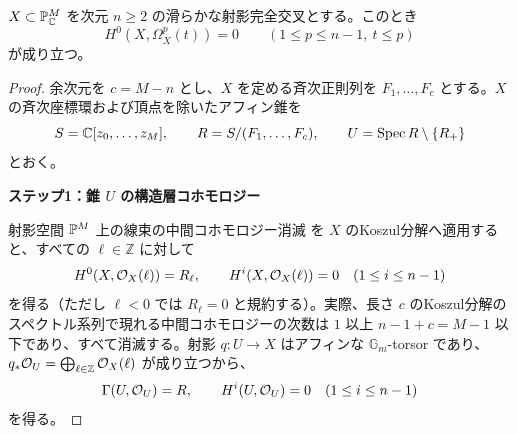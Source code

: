 \begin{lemma}[微分形式の低次数消滅]\label{lem:ci-low-twist-vanishing}
$X\subset\mathbb P^M_{\mathbb C}$ を次元 $n\ge2$ の滑らかな射影完全交叉とする。このとき
\begin{equation}
H^0(X,\Omega_X^p(t))=0
\qquad(1\le p\le n-1,\ t\le p)
\label{eq:ci-vanishing}
\end{equation}
が成り立つ。
\end{lemma}
\begin{proof}
余次元を $c=M-n$ とし、$X$ を定める斉次正則列を $F_1,\ldots,F_c$ とする。$X$ の斉次座標環および頂点を除いたアフィン錐を
\begin{equation}
S=\mathbb C[z_0,\ldots,z_M],\qquad
R=S/(F_1,\ldots,F_c),\qquad
U=\operatorname{Spec} R\setminus\{R_+\}
\label{eq:ci-punctured-cone}
\end{equation}
とおく。

\par\medskip\noindent\textbf{ステップ1：錐 $U$ の構造層コホモロジー}\par\nobreak\smallskip
射影空間 $\mathbb P^M$ 上の線束の中間コホモロジー消滅 \cite[III, Theorem~5.1]{PHartshorne} を $X$ のKoszul分解へ適用すると、すべての $\ell\in\mathbb Z$ に対して
\begin{equation}
H^0(X,\mathcal O_X(\ell))=R_\ell,\qquad
H^i(X,\mathcal O_X(\ell))=0\quad(1\le i\le n-1)
\label{eq:ci-line-bundle-cohomology}
\end{equation}
を得る（ただし $\ell<0$ では $R_\ell=0$ と規約する）。実際、長さ $c$ のKoszul分解のスペクトル系列で現れる中間コホモロジーの次数は $1$ 以上 $n-1+c=M-1$ 以下であり、すべて消滅する。射影 $q:U\to X$ はアフィンな $\mathbb G_m$-torsor であり、$q_*\mathcal O_U=\bigoplus_{\ell\in\mathbb Z}\mathcal O_X(\ell)$ が成り立つから、
\begin{equation}
\Gamma(U,\mathcal O_U)=R,\qquad
H^i(U,\mathcal O_U)=0\quad(1\le i\le n-1)
\label{eq:ci-cone-cohomology}
\end{equation}
を得る。


\end{proof}
